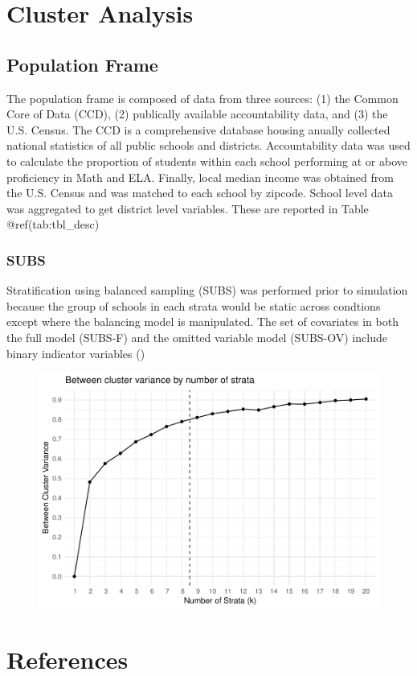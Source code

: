\documentclass[floatsintext,man]{apa6}
\theoremstyle{definition}
\theoremstyle{definition}
\theoremstyle{definition}
\theoremstyle{remark}
\begin{document}
\section{Cluster Analysis}\label{cluster-analysis}

\subsection{Population Frame}\label{population-frame}

The population frame is composed of data from three sources: (1) the
Common Core of Data (CCD), (2) publically available accountability data,
and (3) the U.S. Census. The CCD is a comprehensive database housing
anually collected national statistics of all public schools and
districts. Accountability data was used to calculate the proportion of
students within each school performing at or above proficiency in Math
and ELA. Finally, local median income was obtained from the U.S. Census
and was matched to each school by zipcode. School level data was
aggregated to get district level variables. These are reported in Table
@ref(tab:tbl\_desc)

\subsubsection{SUBS}\label{subs}

Stratification using balanced sampling (SUBS) was performed prior to
simulation because the group of schools in each strata would be static
across condtions except where the balancing model is manipulated. The
set of covariates in both the full model (SUBS-F) and the omitted
variable model (SUBS-OV) include binary indicator variables ()

\begin{figure}
\centering
\includegraphics{Method_files/figure-latex/SUBS_FULL-1.pdf}
\caption{}
\end{figure}

\newpage

\section{References}\label{references}

\begingroup
\setlength{\parindent}{-0.5in} \setlength{\leftskip}{0.5in}

\hypertarget{refs}{}

\endgroup
\end{document}
